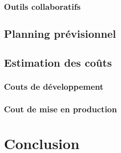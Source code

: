 \subsubsection{Outils collaboratifs}
\blindtext

\subsection{Planning prévisionnel}
\blindtext

\subsection{Estimation des coûts}
\blindtext

\subsubsection{Couts de développement}
\blindtext

\subsubsection{Cout de mise en production}
\blindtext



\section*{Conclusion}%
%
